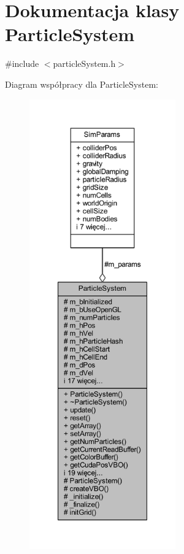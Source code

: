 \hypertarget{class_particle_system}{\section{Dokumentacja klasy Particle\-System}
\label{class_particle_system}
}


{\ttfamily \#include $<$particle\-System.\-h$>$}



Diagram współpracy dla Particle\-System\-:\nopagebreak
\begin{figure}[H]
\begin{center}
\leavevmode
\includegraphics[height=550pt]{class_particle_system__coll__graph}
\end{center}
\end{figure}
